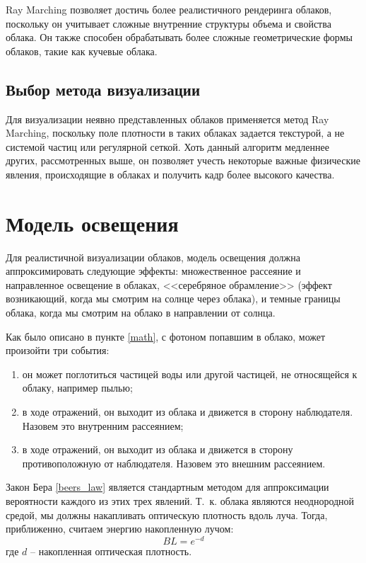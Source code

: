 Ray Marching позволяет достичь более реалистичного рендеринга облаков, поскольку он учитывает сложные внутренние структуры объема и свойства облака. Он также способен обрабатывать более сложные геометрические формы облаков, такие как кучевые облака.

\subsection{Выбор метода визуализации}
Для визуализации неявно представленных облаков применяется метод Ray Marching, поскольку поле плотности в таких облаках задается текстурой, а не системой частиц или регулярной сеткой. Хоть данный алгоритм медленнее других, рассмотренных выше, он позволяет учесть некоторые важные физические явления, происходящие в облаках и получить кадр более высокого качества.


\section{Модель освещения}

Для реалистичной визуализации облаков, модель освещения должна аппроксимировать следующие эффекты: множественное рассеяние и направленное освещение в облаках, <<серебряное обрамление>> (эффект возникающий, когда мы смотрим на солнце через облака), и темные границы облака, когда мы смотрим на облако в направлении от солнца. 

Как было описано в пункте \ref{math}, с фотоном попавшим в облако, может произойти три события:
\begin{enumerate}
	\item он может поглотиться частицей воды или другой частицей, не относящейся к облаку, например пылью;
	\item в ходе отражений, он выходит из облака и движется в сторону наблюдателя. Назовем это внутренним рассеянием;
	\item в ходе отражений, он выходит из облака и движется в сторону противоположную от наблюдателя. Назовем это внешним рассеянием.
\end{enumerate}
Закон Бера \eqref{beers_law} является стандартным методом для аппроксимации вероятности каждого из этих трех явлений. Т.~к. облака являются неоднородной средой, мы должны накапливать оптическую плотность вдоль луча. Тогда, приближенно, считаем энергию накопленную лучом:
\begin{equation}
	\label{bl}
	BL = e ^ {-d}
\end{equation}
где $ d $ -- накопленная оптическая плотность.


